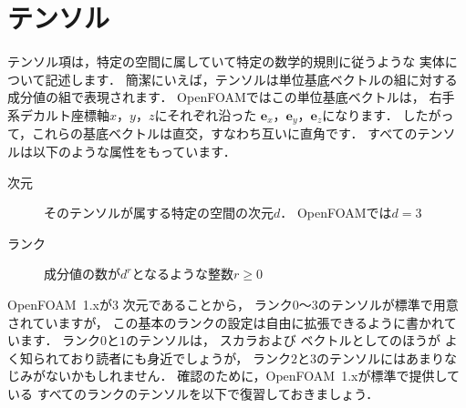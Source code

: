 \section{テンソル}
\label{sec:1.2}
テンソル項は，特定の空間に属していて特定の数学的規則に従うような
実体について記述します．
簡潔にいえば，テンソルは単位基底ベクトルの組に対する
成分値の組で表現されます．
OpenFOAMではこの単位基底ベクトルは，
%
右手系デカルト座標軸$x$，$y$，$z$にそれぞれ沿った
$\mathbf{e}_{x}$，$\mathbf{e}_{y}$，$\mathbf{e}_{z}$になります．
したがって，これらの基底ベクトルは直交，すなわち互いに直角です．
すべてのテンソルは以下のような属性をもっています．
\begin{description}
 \item[次元] そのテンソルが属する特定の空間の次元$d$．
            OpenFOAMでは$d = 3$
%
 \item[ランク] 成分値の数が$d^{r}$となるような整数$r \ge 0$
\end{description}
OpenFOAM~1.xが3
%
次元であることから，
ランク$0$〜$3$のテンソルが標準で用意されていますが，
この基本のランクの設定は自由に拡張できるように書かれています．
ランク$0$と$1$のテンソルは，
%
スカラおよび
%
ベクトルとしてのほうが
よく知られており読者にも身近でしょうが，
ランク$2$と$3$のテンソルにはあまりなじみがないかもしれません．
確認のために，OpenFOAM~1.xが標準で提供している
すべてのランクのテンソルを以下で復習しておきましょう．
